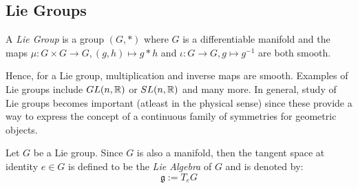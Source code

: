 \subsection{Lie Groups}
\begin{definition}
    A \textit{Lie Group} is a group $(G,*)$ where $G$ is a differentiable manifold and the maps $\mu:G\times G\rightarrow G, (g,h)\mapsto g*h$ and $\iota:G\rightarrow G, g\mapsto g^{-1}$ are both smooth.
\end{definition}
Hence, for a Lie group, multiplication and inverse maps are smooth. Examples of Lie groups include ${GL}(n,\mathbb{R})$ or $SL(n,\mathbb{R})$ and many more. In general, study of Lie groups becomes important (atleast in the physical sense) since these provide a way to express the concept of a continuous family of symmetries for geometric objects.\\[0.2cm]
\begin{definition}
    Let $G$ be a Lie group. Since $G$ is also a manifold, then the tangent space at identity $e\in G$ is defined to be the \textit{Lie Algebra} of $G$ and is denoted by:
    $$\mathfrak{g}:= T_eG$$
\end{definition}